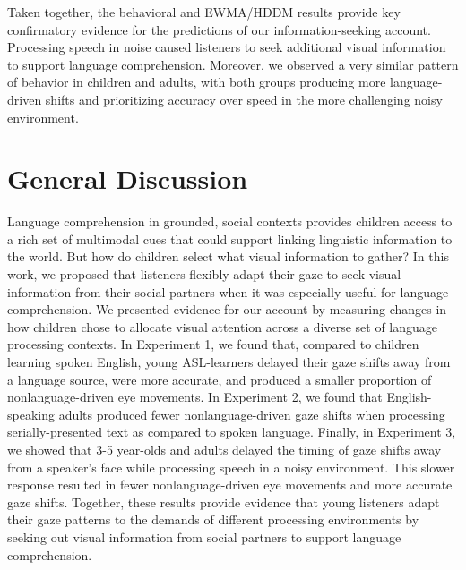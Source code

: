 \documentclass[english,floatsintext,man]{apa6}
\begin{document}
Taken together, the behavioral and EWMA/HDDM results provide key
confirmatory evidence for the predictions of our information-seeking
account. Processing speech in noise caused listeners to seek additional
visual information to support language comprehension. Moreover, we
observed a very similar pattern of behavior in children and adults, with
both groups producing more language-driven shifts and prioritizing
accuracy over speed in the more challenging noisy environment.

\hypertarget{general-discussion}{%
\section{General Discussion}\label{general-discussion}}

Language comprehension in grounded, social contexts provides children
access to a rich set of multimodal cues that could support linking
linguistic information to the world. But how do children select what
visual information to gather? In this work, we proposed that listeners
flexibly adapt their gaze to seek visual information from their social
partners when it was especially useful for language comprehension. We
presented evidence for our account by measuring changes in how children
chose to allocate visual attention across a diverse set of language
processing contexts. In Experiment 1, we found that, compared to
children learning spoken English, young ASL-learners delayed their gaze
shifts away from a language source, were more accurate, and produced a
smaller proportion of nonlanguage-driven eye movements. In Experiment 2,
we found that English-speaking adults produced fewer nonlanguage-driven
gaze shifts when processing serially-presented text as compared to
spoken language. Finally, in Experiment 3, we showed that 3-5 year-olds
and adults delayed the timing of gaze shifts away from a speaker's face
while processing speech in a noisy environment. This slower response
resulted in fewer nonlanguage-driven eye movements and more accurate
gaze shifts. Together, these results provide evidence that young
listeners adapt their gaze patterns to the demands of different
processing environments by seeking out visual information from social
partners to support language comprehension.
\end{document}
